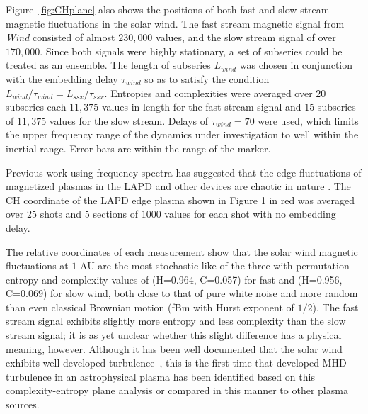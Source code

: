 \documentclass[aps,prx,twocolumn,secnumarabic,nobalancelastpage,amsmath,amssymb,
nofootinbib]{revtex4-1}
\begin{document}


Figure~\ref{fig:CHplane} also shows the positions of both fast and slow stream magnetic fluctuations in the solar wind.  The fast stream magnetic signal from \textit{Wind} consisted of almost $230,000$ values, and the slow stream signal of over $170,000$. Since both signals were highly stationary, a set of subseries could be treated as an ensemble. The length of subseries $L_{wind}$ was chosen in conjunction with the embedding delay $\tau_{wind}$ so as to satisfy the condition $L_{wind}/\tau_{wind} = L_{ssx}/\tau_{ssx}$. Entropies and complexities were averaged over $20$ subseries each $11,375$ values in length for the fast stream signal and $15$ subseries of $11,375$ values for the slow stream. Delays of $\tau_{wind} = 70$ were used, which limits the  upper frequency range of the dynamics under investigation to well within the inertial range. Error bars are within the range of the marker.

Previous work using frequency spectra has suggested that the edge fluctuations of magnetized plasmas in the LAPD and other devices are chaotic in nature \cite{maggs2012}. The CH coordinate of the LAPD edge plasma shown in Figure 1 in red was averaged over $25$ shots and $5$ sections of $1000$ values for each shot with no embedding delay. 

The relative coordinates of each measurement show that the solar wind magnetic fluctuations at $1$ AU are the most stochastic-like of the three with permutation entropy and complexity values of (H=0.964, C=0.057) for fast and (H=0.956, C=0.069) for slow wind, both close to that of pure white noise and more random than even classical Brownian motion (fBm with Hurst exponent of $1/2$). The fast stream signal exhibits slightly more entropy and less complexity than the slow stream signal; it is as yet unclear whether this slight difference has a physical meaning, however. Although it has been well documented that the solar wind exhibits well-developed turbulence~\cite{bruno2013}, this is the first time that developed MHD turbulence in an astrophysical plasma has been identified based on this complexity-entropy plane analysis or compared in this manner to other plasma sources.
\end{document}
